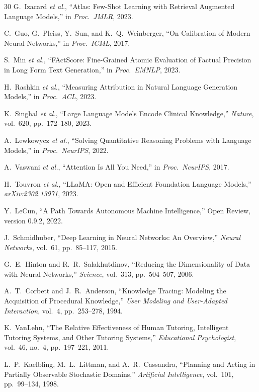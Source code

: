 \documentclass[11pt,letterpaper]{article}
\begin{document}
\begin{thebibliography}{30}
G.~Izacard \emph{et al.}, ``Atlas: Few-Shot Learning with Retrieval Augmented Language Models,'' in \emph{Proc.\ JMLR}, 2023.

C.~Guo, G.~Pleiss, Y.~Sun, and K.~Q.~Weinberger, ``On Calibration of Modern Neural Networks,'' in \emph{Proc.\ ICML}, 2017.

S.~Min \emph{et al.}, ``FActScore: Fine-Grained Atomic Evaluation of Factual Precision in Long Form Text Generation,'' in \emph{Proc.\ EMNLP}, 2023.

H.~Rashkin \emph{et al.}, ``Measuring Attribution in Natural Language Generation Models,'' in \emph{Proc.\ ACL}, 2023.

K.~Singhal \emph{et al.}, ``Large Language Models Encode Clinical Knowledge,'' \emph{Nature}, vol.~620, pp.~172--180, 2023.

A.~Lewkowycz \emph{et al.}, ``Solving Quantitative Reasoning Problems with Language Models,'' in \emph{Proc.\ NeurIPS}, 2022.

A.~Vaswani \emph{et al.}, ``Attention Is All You Need,'' in \emph{Proc.\ NeurIPS}, 2017.

H.~Touvron \emph{et al.}, ``LLaMA: Open and Efficient Foundation Language Models,'' \emph{arXiv:2302.13971}, 2023.

Y.~LeCun, ``A Path Towards Autonomous Machine Intelligence,'' Open Review, version 0.9.2, 2022.

J.~Schmidhuber, ``Deep Learning in Neural Networks: An Overview,'' \emph{Neural Networks}, vol.~61, pp.~85--117, 2015.

G.~E.~Hinton and R.~R.~Salakhutdinov, ``Reducing the Dimensionality of Data with Neural Networks,'' \emph{Science}, vol.~313, pp.~504--507, 2006.

A.~T.~Corbett and J.~R.~Anderson, ``Knowledge Tracing: Modeling the Acquisition of Procedural Knowledge,'' \emph{User Modeling and User-Adapted Interaction}, vol.~4, pp.~253--278, 1994.

K.~VanLehn, ``The Relative Effectiveness of Human Tutoring, Intelligent Tutoring Systems, and Other Tutoring Systems,'' \emph{Educational Psychologist}, vol.~46, no.~4, pp.~197--221, 2011.

L.~P.~Kaelbling, M.~L.~Littman, and A.~R.~Cassandra, ``Planning and Acting in Partially Observable Stochastic Domains,'' \emph{Artificial Intelligence}, vol.~101, pp.~99--134, 1998.

\end{thebibliography}
\end{document}
